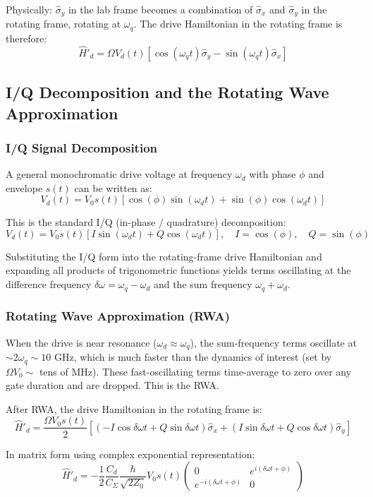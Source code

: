 \documentclass{article}
\begin{document}
Physically: $\hat{\sigma}_y$ in the lab frame becomes a combination of $\hat{\sigma}_x$ and $\hat{\sigma}_y$ in the rotating frame, rotating at $\omega_q$. The drive Hamiltonian in the rotating frame is therefore:
$$\hat{H}'_d = \Omega V_d(t) [\cos(\omega_q t) \hat{\sigma}_y - \sin(\omega_q t) \hat{\sigma}_x]$$

\subsection{I/Q Decomposition and the Rotating Wave Approximation}

\subsubsection*{I/Q Signal Decomposition}

A general monochromatic drive voltage at frequency $\omega_d$ with phase $\phi$ and envelope $s(t)$ can be written as:
$$V_d(t) = V_0 s(t) [\cos(\phi) \sin(\omega_d t) + \sin(\phi) \cos(\omega_d t)]$$

This is the standard I/Q (in-phase / quadrature) decomposition:
$$V_d(t) = V_0 s(t) [I \sin(\omega_d t) + Q \cos(\omega_d t)], \quad I = \cos(\phi), \quad Q = \sin(\phi)$$

Substituting the I/Q form into the rotating-frame drive Hamiltonian and expanding all products of trigonometric functions yields terms oscillating at the difference frequency $\delta\omega = \omega_q - \omega_d$ and the sum frequency $\omega_q + \omega_d$.

\subsubsection*{Rotating Wave Approximation (RWA)}

When the drive is near resonance ($\omega_d \approx \omega_q$), the sum-frequency terms oscillate at $\sim 2\omega_q \sim 10$ GHz, which is much faster than the dynamics of interest (set by $\Omega V_0 \sim$ tens of MHz). These fast-oscillating terms time-average to zero over any gate duration and are dropped. This is the RWA.

After RWA, the drive Hamiltonian in the rotating frame is:
$$\hat{H}'_d = \frac{\Omega V_0 s(t)}{2} [(-I \cos \delta\omega t + Q \sin \delta\omega t) \hat{\sigma}_x + (I \sin \delta\omega t + Q \cos \delta\omega t) \hat{\sigma}_y]$$

In matrix form using complex exponential representation:
$$\hat{H}'_d = -\frac{1}{2}\frac{C_d}{C_\Sigma}\frac{\hbar}{\sqrt{2Z_0}} V_0 s(t) \begin{pmatrix} 0 & e^{i(\delta\omega t + \phi)} \\ e^{-i(\delta\omega t + \phi)} & 0 \end{pmatrix}$$
\end{document}
